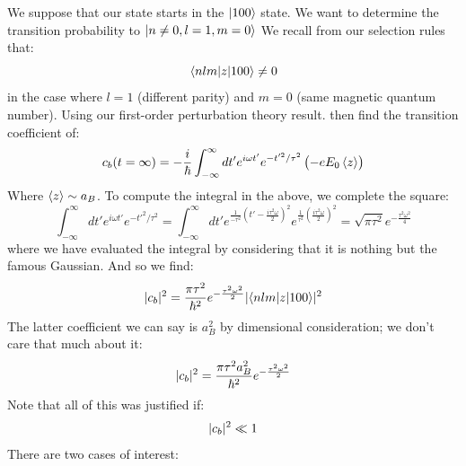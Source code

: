 We suppose that our state starts in the $\lvert 100 \rangle$ state. We want to determine the transition probability to $\lvert n \neq 0, l = 1, m = 0 \rangle$ We recall from our selection rules that:
\begin{equation}
    \langle nlm \rvert z\lvert 100 \rangle \neq 0
\end{equation}
in the case where $l = 1$ (different parity) and $m = 0$ (same magnetic quantum number). Using our first-order perturbation theory result. then find the transition coefficient of:
\begin{equation}
    c_b(t = \infty) = -\frac{i}{\hbar} \int_{-\infty}^\infty dt' e^{i\omega t'} e^{-t'^2/\tau^2}\left(-eE_0\left< z \right>\right)
\end{equation}
Where $\left< z \right> \sim a_B$. To compute the integral in the above, we complete the square:
\begin{equation}
    \int_{-\infty}^\infty dt' e^{i\omega t'} e^{-t'^2/\tau^2} = \int_{-\infty}^\infty dt' e^{\frac{1}{-\tau^2}\left(t' - \frac{i\tau^2\omega}{2}\right)^2}e^{\frac{1}{\tau^2}\left(\frac{i\tau^2\omega}{2}\right)^2} = \sqrt{\pi \tau^2}e^{-\frac{\tau^2\omega^2}{4}}
\end{equation}
where we have evaluated the integral by considering that it is nothing but the famous Gaussian. And so we find:
\begin{equation}
    \lvert c_b \rvert^2 = \frac{\pi\tau^2}{\hbar^2}e^{-\frac{\tau^2\omega^2}{2}}\lvert \langle nlm \rvert z\lvert 100 \rangle \rvert^2
\end{equation}
The latter coefficient we can say is $a_B^2$ by dimensional consideration; we don't care that much about it:
\begin{equation}
    \lvert c_b \rvert^2 = \frac{\pi\tau^2a_B^2}{\hbar^2}e^{-\frac{\tau^2\omega^2}{2}}
\end{equation}
Note that all of this was justified if:
\begin{equation}
    \lvert c_b \rvert^2 \ll 1
\end{equation}
There are two cases of interest:

